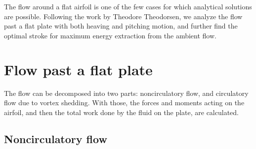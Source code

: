
The flow around a flat airfoil is one of the few cases for which analytical solutions are possible.
Following the work by Theodore Theodorsen, we analyze the flow past a flat plate with both heaving and pitching motion, and further find the optimal stroke for maximum energy extraction from the ambient flow. 

\section{Flow past a flat plate}

The flow can be decomposed into two parts: noncirculatory flow, and circulatory flow due to vortex shedding.
With those, the forces and moments acting on the airfoil, and then the total work done by the fluid on the plate, are calculated.

\subsection{Noncirculatory flow}

